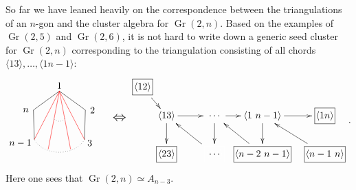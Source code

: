 \documentclass[11pt]{article}
\DeclareMathOperator{\Gr}{Gr}
\def\ket#1{\langle #1 \rangle}
\begin{document}
So far we have leaned heavily on the correspondence between the triangulations of an $n$-gon and the cluster algebra for $\Gr(2,n)$. Based on the examples of $\Gr(2,5)$ and $\Gr(2,6)$, it is not hard to write down a generic seed cluster for $\Gr(2,n)$ corresponding to the triangulation consisting of all chords $\ket{13},\ldots,\ket{1n{-}1}$:
\begin{equation}\label{eq:g2n-seed}
\begin{gathered}
\begin{tikzpicture}
	\coordinate (P1) at (90:1);
	\coordinate (P2) at (18:1);
	\coordinate (P3) at (320:1.2);
	\coordinate (P4) at (220:1.2);
	\coordinate (P5) at (162:1);
	\draw (0,1.2) node {1};
	\draw (1,.3) node[anchor=west] {2};
	\draw (.9,-.9) node[anchor=west] {3};
	\draw (-.9,-.9) node[anchor=east] {$n-1$};
	\draw (-1,.3) node[anchor=east] {$n$};
	\draw (P1) -- (P2) -- (P3);
	\draw[dotted] (P3) to[out=240,in=300] (P4);
	\draw (P4) -- (P5) -- (P1);
	\draw[red] (P1) -- (P3);
	\draw[red] (P1) -- (P4);
	\draw[red] (P1) -- (290:1.2);
	\draw[red] (P1) -- (250:1.2);
	\draw[dotted] (.2,0) to[out=240,in=300] (-.2,0);
	\draw (2.2,0) node {\scalebox{1.4}{$\Leftrightarrow$}};
\end{tikzpicture}  
\begin{xy} 0;<1pt,0pt>:<0pt,1pt>::
	(25,40) *+{\langle 13\rangle} ="0",
	(75,40) *+{\color{white} \langle 14\rangle} ="1",
	(125,40) *+{\langle 1\ n-1 \rangle} ="2",
	(0,70) *+{\framebox[5ex]{$\langle 12\rangle$}} ="3",
	(25,0) *+{\framebox[5ex]{$\langle 23\rangle$}} ="4",
	(75,0) *+{\color{white} \framebox[5ex]{$\langle 34\rangle$}} ="5",
	(125,0) *+{\framebox[14ex]{$\langle n-2 \ n-1\rangle$}} ="6",
	(190,0) *+{\framebox[10ex]{$\langle n-1 \ n\rangle$}} ="7",
	(190,40) *+{\framebox[5ex]{$\langle 1n \rangle$}} ="8",
	(75,40) *+{\dots} ="01",
	(75,0) *+{\dots} ="05",
	"0", {\ar"1"},
	"1", {\ar"2"},
	"3", {\ar"0"},
	"0", {\ar"4"},
	"5", {\ar"0"},
	"1", {\ar"5"},
	"6", {\ar"1"},
	"2", {\ar"6"},
	"7", {\ar"2"},
	"2", {\ar"8"},
\end{xy}
\end{gathered}.
\end{equation}
Here one sees that $\Gr(2,n) \simeq A_{n-3}$. 
\end{document}
